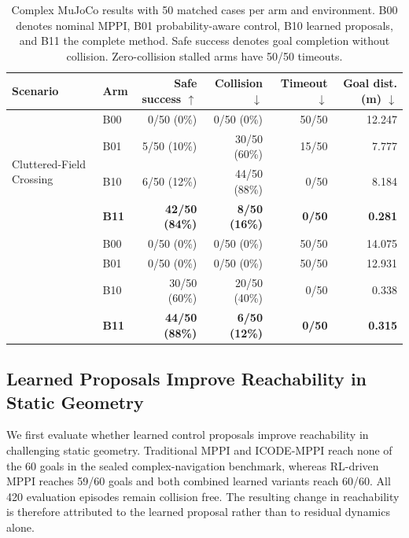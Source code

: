 \documentclass[conference]{IEEEtran}
\begin{document}
\begin{table}[!t]
\caption{Complex MuJoCo results with 50 matched cases per arm and environment.
B00 denotes nominal MPPI, B01 probability-aware control, B10 learned
proposals, and B11 the complete method. Safe success denotes goal completion
without collision. Zero-collision stalled arms have 50/50 timeouts.}
\label{tab:complex}
\centering
\scriptsize
\setlength{\tabcolsep}{7.0pt}
\begin{tabular}{llrrrr}
\toprule
\textbf{Scenario} & \textbf{Arm}
& \textbf{Safe success $\uparrow$}
& \textbf{Collision $\downarrow$}
& \textbf{Timeout $\downarrow$}
& \textbf{Goal dist. (m) $\downarrow$} \\
\midrule
\multirow{4}{*}{Cluttered-Field Crossing}
& B00 & 0/50 (0\%)  & 0/50 (0\%)   & 50/50 & 12.247 \\
& B01 & 5/50 (10\%) & 30/50 (60\%) & 15/50 & 7.777 \\
& B10 & 6/50 (12\%) & 44/50 (88\%) & 0/50  & 8.184 \\
& \textbf{B11}
& \textbf{42/50 (84\%)}
& \textbf{8/50 (16\%)}
& \textbf{0/50}
& \textbf{0.281} \\
\addlinespace[2pt]
\multirow{4}{*}{Scattered-Clutter Traversal}
& B00 & 0/50 (0\%)   & 0/50 (0\%)   & 50/50 & 14.075 \\
& B01 & 0/50 (0\%)   & 0/50 (0\%)   & 50/50 & 12.931 \\
& B10 & 30/50 (60\%) & 20/50 (40\%) & 0/50  & 0.338 \\
& \textbf{B11}
& \textbf{44/50 (88\%)}
& \textbf{6/50 (12\%)}
& \textbf{0/50}
& \textbf{0.315} \\
\bottomrule
\end{tabular}
\end{table}


\subsection{Learned Proposals Improve Reachability in Static Geometry}

We first evaluate whether learned control proposals improve reachability in
challenging static geometry. Traditional MPPI and ICODE-MPPI reach none of
the 60 goals in the sealed complex-navigation benchmark, whereas RL-driven
MPPI reaches 59/60 goals and both combined learned variants reach 60/60.
All 420 evaluation episodes remain collision free. The resulting change in
reachability is therefore attributed to the learned proposal rather than to
residual dynamics alone.
\end{document}
